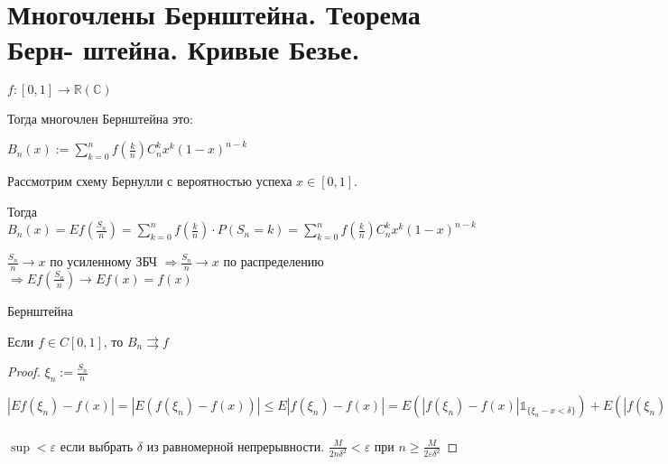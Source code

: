 \section{Многочлены Бернштейна. Теорема Берн-
штейна. Кривые Безье.}

\begin{definition}
	$f: [0, 1] \rightarrow \mathbb{R}(\mathbb{C})$ 
	
	Тогда многочлен Бернштейна это:
	
	$B_n(x) := \sum\limits_{k = 0}^n f(\frac{k}{n}) C_n^k x^k (1 - x)^{n-k}$
\end{definition}

\begin{observation}
	Рассмотрим схему Бернулли с вероятностью успеха $x \in [0, 1]$. 
	
	Тогда $B_n(x) = Ef(\frac{S_n}{n}) = \sum\limits_{k = 0}^n f(\frac{k}{n}) \cdot P(S_n = k) = \sum\limits_{k = 0}^n f(\frac{k}{n}) C_n^k x^k (1 - x)^{n-k}$
	
	$\frac{S_n}{n} \rightarrow x$ по усиленному ЗБЧ $\Rightarrow \frac{S_n}{n} \rightarrow x$ по распределению $\Rightarrow Ef(\frac{S_n}{n}) \rightarrow Ef(x) = f(x)$
\end{observation}

\begin{theorem}
	Бернштейна
	
	Если $f \in C[0, 1]$, то $B_n \rightrightarrows f$
\end{theorem}

\begin{proof}
	$\xi_n := \frac{S_n}{n}$
	
	$|Ef(\xi_n) - f(x)| = |E(f(\xi_n) - f(x))| \leqslant E|f(\xi_n)-f(x)| = E(|f(\xi_n) - f(x)|\mathds{1}_{\{\xi_n-x < \delta\}}) + E(|f(\xi_n) - f(x)|\mathds{1}_{\{\xi_n-x \geqslant \delta\}}) \leqslant \sup\limits_{|x - y| < \delta} |f(x) - f(y)| + E(2M\mathds{1}_{\{\xi_n-x \geqslant \delta\}}) = \sup\limits_{|x - y| < \delta} |f(x) - f(y)| + 2M P(|\xi_n - x| \geqslant \delta) \leqslant \sup\limits_{|x - y| < \delta} |f(x) - f(y)| + 2M\frac{D\frac{S_n}{n}}{\delta^2} = \sup\limits_{|x - y| < \delta} |f(x) - f(y)| + \frac{x(1-x)n}{n^2\delta^2} \leqslant \sup\limits_{|x - y| < \delta} |f(x) - f(y)| + \frac{M}{2n\delta^2} < 2\varepsilon$
	
	$\sup < \varepsilon$ если выбрать $\delta$ из равномерной непрерывности. $\frac{M}{2n\delta^2} < \varepsilon$ при $n \geqslant \frac{M}{2\varepsilon\delta^2}$
\end{proof}

